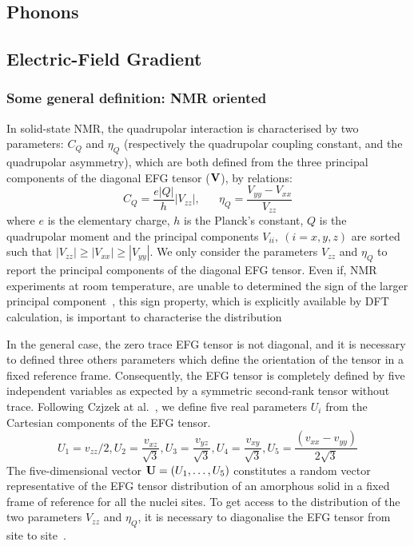 \documentclass[a4paper]{article}
\begin{document}
\subsection{Phonons\label{sec:VIB}}

\subsection{Electric-Field Gradient\label{sec:EFG}}

\subsubsection{Some general definition: NMR oriented}

In solid-state NMR, the  quadrupolar interaction is  characterised by two parameters:
$C_Q$ and $\eta_Q$ (respectively the quadrupolar coupling constant, and  the
quadrupolar asymmetry), which are both defined from the  three principal  components
of the diagonal  EFG tensor  ($\bf{V}$), by relations:
\begin{equation}
  \label{eq:quad}
 C_Q=\frac{e|Q|}{h}|V_{zz}| ,\;\;\;\;\;\; \eta_Q=\frac{V_{yy}-V_{xx}}{V_{zz}}
\end{equation}
where $e$ is the elementary charge, $h$ is the Planck's constant, $Q$
is the quadrupolar  moment and the principal components $V_{ii},\ (i=x,y,z)$ are sorted
such that  $|V_{zz}|  \geqslant |V_{xx}| \geqslant |V_{yy}|$. 
We only consider the parameters $V_{zz}$ and $\eta_Q$ to report the principal
components of the diagonal EFG tensor. Even if, NMR experiments at room temperature, are unable
to determined the sign of the larger principal component~\cite{B-Abragam}, this sign property,
which is explicitly available by DFT calculation, is important to characterise the distribution~\cite{VasconcelosPRB}

In the general  case, the  zero trace  EFG tensor  is not
diagonal,  and it  is  necessary to  defined  three others  parameters
which  define the orientation  of the tensor in a fixed reference frame.
Consequently, the EFG tensor is completely defined by five independent
variables as expected by a symmetric second-rank tensor without trace.
Following Czjzek at al.~\cite{PRB.23.2513}, we define five real parameters
$U_i$ from the Cartesian components of the EFG tensor.
\begin{equation}
  \label{eq:U_i}
  U_1=v_{zz}/2, U_2=\frac{v_{xz}}{\sqrt{3}},U_3=\frac{v_{yz}}{\sqrt{3}},U_4=\frac{v_{xy}}{\sqrt{3}},U_5=\frac{(v_{xx}-v_{yy})}{2\sqrt{3}}  
\end{equation}
The five-dimensional vector ${\bf{U}}=(U_1,\ldots,U_5)$ constitutes a random vector
representative of the EFG tensor distribution of an amorphous solid in a fixed frame
of reference for all the nuclei sites. To get access to the distribution of the two
parameters $V_{zz}$ and $\eta_Q$, it is necessary to diagonalise the EFG tensor from
site to site~\cite{JPCM.10.10715}.
\end{document}
